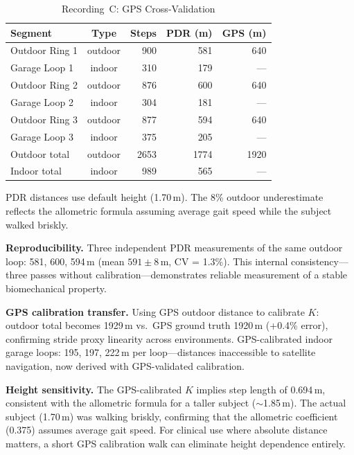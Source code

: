 \documentclass[11pt,a4paper]{article}
\begin{document}
\begin{table}[H]
\centering
\caption{Recording~C: GPS Cross-Validation}
\label{tab:gps}
\begin{tabular}{@{}lcrrr@{}}
\toprule
Segment & Type & Steps & PDR (m) & GPS (m) \\
\midrule
Outdoor Ring 1 & outdoor & 900 & 581 & 640 \\
Garage Loop 1  & indoor  & 310 & 179 & --- \\
Outdoor Ring 2 & outdoor & 876 & 600 & 640 \\
Garage Loop 2  & indoor  & 304 & 181 & --- \\
Outdoor Ring 3 & outdoor & 877 & 594 & 640 \\
Garage Loop 3  & indoor  & 375 & 205 & --- \\
\midrule
Outdoor total  & outdoor & 2653 & 1774 & 1920 \\
Indoor total   & indoor  & 989 & 565 & --- \\
\bottomrule
\end{tabular}

\vspace{2mm}
{\footnotesize PDR distances use default height (1.70\,m). The 8\% outdoor
underestimate reflects the allometric formula assuming average gait speed while
the subject walked briskly.}
\end{table}

\textbf{Reproducibility.} Three independent PDR measurements of the same
outdoor loop: 581, 600, 594\,m (mean $591 \pm 8$\,m, CV = 1.3\%). This
internal consistency---three passes without calibration---demonstrates reliable
measurement of a stable biomechanical property.

\textbf{GPS calibration transfer.} Using GPS outdoor distance to calibrate
$K$: outdoor total becomes 1929\,m vs.\ GPS ground truth 1920\,m (+0.4\%
error), confirming stride proxy linearity across environments.
GPS-calibrated indoor garage loops: 195, 197, 222\,m per loop---distances
inaccessible to satellite navigation, now derived with GPS-validated
calibration.

\textbf{Height sensitivity.} The GPS-calibrated $K$ implies step length of
0.694\,m, consistent with the allometric formula for a taller subject
(${\sim}$1.85\,m). The actual subject (1.70\,m) was walking briskly,
confirming that the allometric coefficient (0.375) assumes average gait speed.
For clinical use where absolute distance matters, a short GPS calibration walk
can eliminate height dependence entirely.
\end{document}
